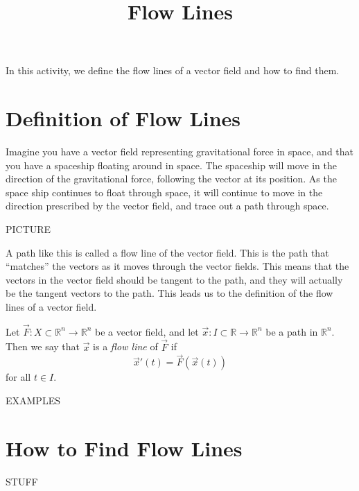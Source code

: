 \documentclass{ximera}
\title{Flow Lines}
\begin{document}
\begin{abstract}
\end{abstract}
\maketitle

In this activity, we define the flow lines of a vector field and how to find them.

\section*{Definition of Flow Lines}

Imagine you have a vector field representing gravitational force in space, and that you have a spaceship floating around in space. The spaceship will move in the direction of the gravitational force, following the vector at its position. As the space ship continues to float through space, it will continue to move in the direction prescribed by the vector field, and trace out a path through space.

PICTURE

A path like this is called a flow line of the vector field. This is the path that ``matches'' the vectors as it moves through the vector fields. This means that the vectors in the vector field should be tangent to the path, and they will actually be the tangent vectors to the path. This leads us to the definition of the flow lines of a vector field.

\begin{definition}
Let $\vec{F}:X\subset \mathbb{R}^n\rightarrow\mathbb{R}^n$ be a vector field, and let $\vec{x}:I\subset \mathbb{R}\rightarrow\mathbb{R}^n$ be a path in $\mathbb{R}^n$. Then we say that $\vec{x}$ is a \emph{flow line} of $\vec{F}$ if 
\[
\vec{x}'(t) = \vec{F}(\vec{x}(t))
\]
for all $t\in I$.
\end{definition}

EXAMPLES 


\section*{How to Find Flow Lines}

STUFF
\end{document}
